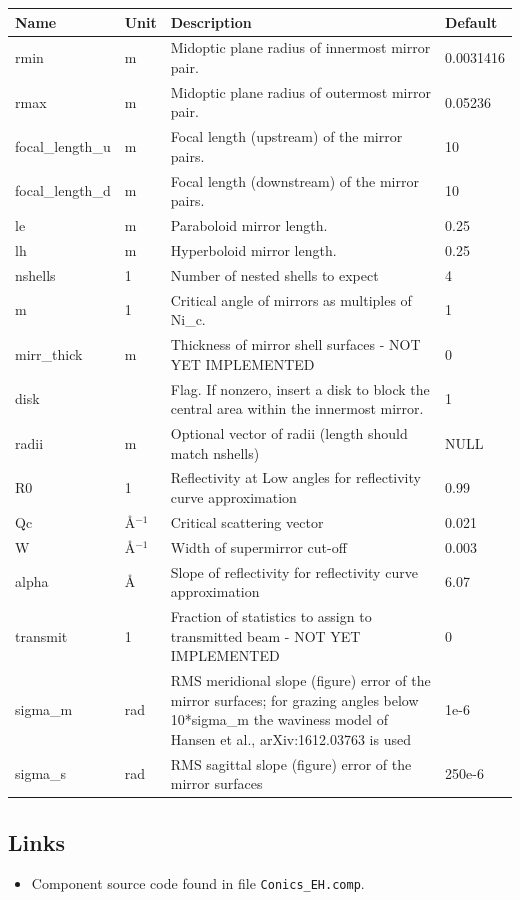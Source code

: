\begin{longtable}{p{}p{}p{}p{}}
\toprule
\textbf{Name} & \textbf{Unit} & \textbf{Description} & \textbf{Default} \\
\midrule
\endhead
rmin & m & Midoptic plane radius of innermost mirror pair. & 0.0031416 \\
rmax & m & Midoptic plane radius of outermost mirror pair. & 0.05236 \\
focal\_length\_u & m & Focal length (upstream) of the mirror pairs. & 10 \\
focal\_length\_d & m & Focal length (downstream) of the mirror pairs. & 10 \\
le & m & Paraboloid mirror length. & 0.25 \\
lh & m & Hyperboloid mirror length. & 0.25 \\
nshells & 1 & Number of nested shells to expect & 4 \\
m & 1 & Critical angle of mirrors as multiples of Ni\_c. & 1 \\
mirr\_thick & m & Thickness of mirror shell surfaces - NOT YET IMPLEMENTED & 0 \\
disk &   & Flag. If nonzero, insert a disk to block the central area within the innermost mirror. & 1 \\
radii & m & Optional vector of radii (length should match nshells) & NULL \\
R0 & 1 & Reflectivity at Low angles for reflectivity curve approximation & 0.99 \\
Qc & \AA{}$^{-1}$ & Critical scattering vector & 0.021 \\
W & \AA{}$^{-1}$ & Width of supermirror cut-off & 0.003 \\
alpha & \AA{} & Slope of reflectivity for reflectivity curve approximation & 6.07 \\
transmit & 1 & Fraction of statistics to assign to transmitted beam - NOT YET IMPLEMENTED & 0 \\
sigma\_m & rad & RMS meridional slope (figure) error of the mirror surfaces; for grazing angles below 10*sigma\_m the waviness model of Hansen et al., arXiv:1612.03763 is used & 1e-6 \\
sigma\_s & rad & RMS sagittal slope (figure) error of the mirror surfaces & 250e-6 \\
\bottomrule
\end{longtable}

\subsection*{Links}
\begin{itemize}
  \item Component source code found in file \texttt{Conics\_EH.comp}.
\end{itemize}
